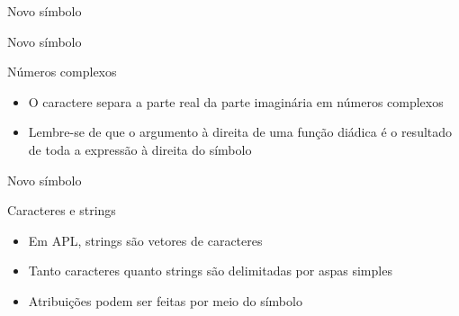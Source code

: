 \begin{frame}[fragile]{Novo símbolo}


\end{frame}

\begin{frame}[fragile]{Novo símbolo}


\end{frame}

\begin{frame}[fragile]{Números complexos}

    \begin{itemize}
        \item O caractere  separa a parte real da parte imaginária em números complexos
        \pause
        \item Lembre-se de que o argumento à direita de uma função diádica é o resultado de toda a expressão à direita do símbolo
    \end{itemize}

\end{frame}

\begin{frame}[fragile]{Novo símbolo}


\end{frame}

\begin{frame}[fragile]{Caracteres e strings}

    \begin{itemize}
        \item Em APL, strings são vetores de caracteres
        \pause

        \item Tanto caracteres quanto strings são delimitadas por aspas simples
        \pause
 
        \item Atribuições podem ser feitas por meio do símbolo 
    \end{itemize}

\end{frame}

